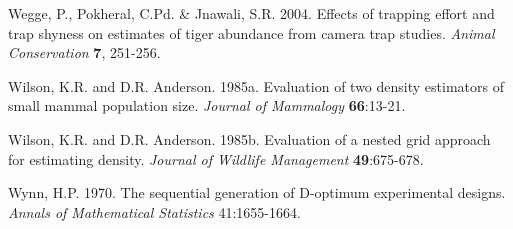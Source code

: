 \documentclass[useAMS,referee]{biom}
\begin{document}
\rf Wegge, P., Pokheral, C.Pd. \& Jnawali, S.R. 2004. Effects of trapping 
effort and trap shyness on estimates of tiger abundance from camera trap 
studies. {\it Animal Conservation} {\bf 7}, 251-256.
 

\rf Wilson, K.R. and D.R. Anderson. 1985a. Evaluation of two density 
estimators of small mammal population size. {\it Journal of Mammalogy}
{\bf 66}:13-21.

\rf Wilson, K.R. and D.R. Anderson. 1985b. Evaluation of a nested 
grid approach for estimating density. {\it Journal of Wildlife Management}
{\bf 49}:675-678.

\rf Wynn, H.P.  1970. The sequential generation of D-optimum
experimental designs.
{\it Annals of Mathematical Statistics} 41:1655-1664.

\end{document}
